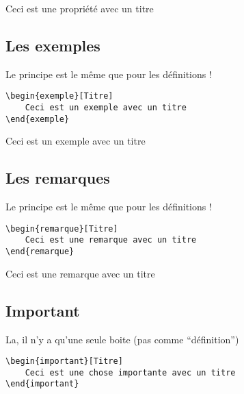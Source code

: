 \documentclass[a4paper,10pt]{article}
\begin{document}
\begin{propriete}[Titre]
	Ceci est une propriété avec un titre
\end{propriete}





		\subsection{Les exemples}

		Le principe est le même que pour les définitions !
		
		\begin{verbatim}
\begin{exemple}[Titre]
	Ceci est un exemple avec un titre
\end{exemple}
		\end{verbatim}
		
\begin{exemple}[Titre]
	Ceci est un exemple avec un titre
\end{exemple}

		\subsection{Les remarques}

		Le principe est le même que pour les définitions !
		
		\begin{verbatim}
\begin{remarque}[Titre]
	Ceci est une remarque avec un titre
\end{remarque}
		\end{verbatim}
		
\begin{remarque}[Titre]
	Ceci est une remarque avec un titre
\end{remarque}


		\subsection{Important}

		La, il n'y a qu'une seule boite (pas comme ``définition'')
		
		\begin{verbatim}
\begin{important}[Titre]
	Ceci est une chose importante avec un titre
\end{important}
		\end{verbatim}
		
\end{document}
